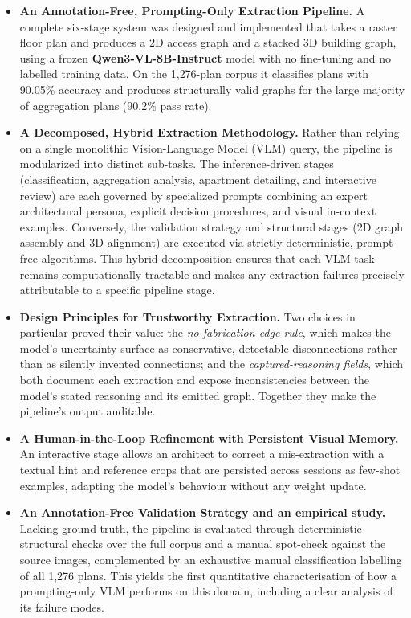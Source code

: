 \documentclass[12pt,a4paper,openright]{report}
\begin{document}
\begin{itemize}
    \item \textbf{An Annotation-Free, Prompting-Only Extraction Pipeline.} A complete six-stage system was designed and implemented that takes a raster floor plan and produces a 2D access graph and a stacked 3D building graph,
    using a frozen \textbf{Qwen3-VL-8B-Instruct} model with no fine-tuning and no labelled training data. On the 1{,}276-plan corpus it classifies plans with 90.05\% accuracy and produces structurally valid graphs for the large majority of aggregation plans (90.2\% pass rate).

    \item \textbf{A Decomposed, Hybrid Extraction Methodology.} Rather than relying on a single monolithic Vision-Language Model (VLM) query, the pipeline is modularized into distinct sub-tasks. The inference-driven stages (classification, aggregation analysis, apartment detailing, and interactive review) are each governed by specialized prompts combining an expert architectural persona, explicit decision procedures, and visual in-context examples. Conversely, the validation strategy and structural stages (2D graph assembly and 3D alignment) are executed via strictly deterministic, prompt-free algorithms. This hybrid decomposition ensures that each VLM task remains computationally tractable and makes any extraction failures precisely attributable to a specific pipeline stage.

    \item \textbf{Design Principles for Trustworthy Extraction.} Two choices in particular proved their value: the \emph{no-fabrication edge rule}, which makes the model's uncertainty surface as conservative, detectable disconnections rather than as silently invented connections; and the \emph{captured-reasoning fields}, which both document each extraction and expose inconsistencies between the model's stated reasoning and its emitted graph. Together they make the pipeline's output auditable.

    \item \textbf{A Human-in-the-Loop Refinement with Persistent Visual Memory.} An interactive stage allows an architect to correct a mis-extraction with a textual hint and reference crops that are persisted across sessions as few-shot examples, adapting the model's behaviour without any weight update.

    \item \textbf{An Annotation-Free Validation Strategy and an empirical study.} Lacking ground truth, the pipeline is evaluated through deterministic structural checks over the full corpus and a manual spot-check against the source images, complemented by an exhaustive manual classification labelling of all 1,276 plans. This yields the first quantitative characterisation of
    how a prompting-only VLM performs on this domain, including a clear analysis of its failure modes.
\end{itemize}
\end{document}

